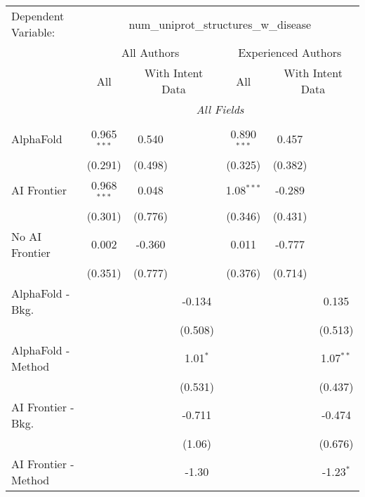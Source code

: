 \begingroup
\centering
\begin{tabular}{lcccccc}
   \tabularnewline \midrule \midrule
   Dependent Variable: & \multicolumn{6}{c}{num\_uniprot\_structures\_w\_disease}\\
 & \multicolumn{3}{c}{All Authors} & \multicolumn{3}{c}{Experienced Authors} \\
\cmidrule(lr){2-4} \cmidrule(lr){5-7}
 & \multicolumn{1}{c}{All} & \multicolumn{2}{c}{With Intent Data} & \multicolumn{1}{c}{All} & \multicolumn{2}{c}{With Intent Data} \\
\cmidrule(lr){2-2} \cmidrule(lr){3-4} \cmidrule(lr){5-5} \cmidrule(lr){6-7}
 & \multicolumn{6}{c}{\textit{All Fields}} \\ \\
   AlphaFold               & 0.965$^{***}$ & 0.540   &            & 0.890$^{***}$ & 0.457   &   \\   
                           & (0.291)       & (0.498) &            & (0.325)       & (0.382) &   \\   
   AI Frontier             & 0.968$^{***}$ & 0.048   &            & 1.08$^{***}$  & -0.289  &   \\   
                           & (0.301)       & (0.776) &            & (0.346)       & (0.431) &   \\   
   No AI Frontier          & 0.002         & -0.360  &            & 0.011         & -0.777  &   \\   
                           & (0.351)       & (0.777) &            & (0.376)       & (0.714) &   \\   
   AlphaFold - Bkg.        &               &         & -0.134     &               &         & 0.135\\   
                           &               &         & (0.508)    &               &         & (0.513)\\   
   AlphaFold - Method      &               &         & 1.01$^{*}$ &               &         & 1.07$^{**}$\\   
                           &               &         & (0.531)    &               &         & (0.437)\\   
   AI Frontier - Bkg.      &               &         & -0.711     &               &         & -0.474\\   
                           &               &         & (1.06)     &               &         & (0.676)\\   
   AI Frontier - Method    &               &         & -1.30      &               &         & -1.23$^{*}$\\   

\end{tabular}
